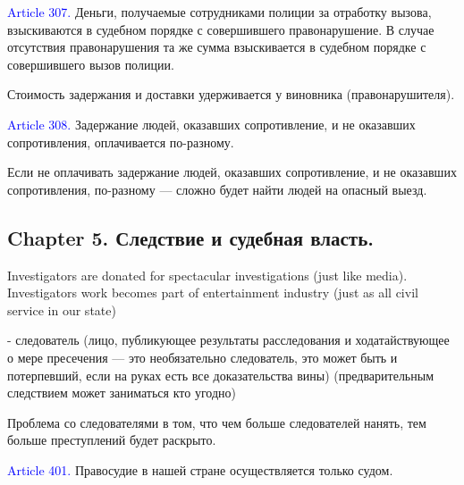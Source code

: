 \documentclass[11pt]{article}
\theoremstyle{remark}
\theoremstyle{definition}
\begin{document}
\color{black}



\textcolor{blue}{Article 307.} Деньги, получаемые сотрудниками полиции за отработку вызова, взыскиваются в судебном порядке с совершившего правонарушение. В случае отсутствия правонарушения та же сумма взыскивается в судебном порядке с совершившего вызов полиции. 

Стоимость задержания и доставки удерживается у виновника (правонарушителя).

\textcolor{blue}{Article 308.} Задержание людей, оказавших сопротивление, и не оказавших сопротивления, оплачивается по-разному.

\color{blue}

Если не оплачивать задержание людей, оказавших сопротивление, и не оказавших сопротивления, по-разному --- сложно будет найти людей на опасный выезд.

\color{black}












\subsection*{Chapter 5. Следствие и судебная власть.} 

Investigators are donated for spectacular investigations (just like media). Investigators work becomes part of entertainment industry (just as all civil service in our state)




- следователь (лицо, публикующее результаты расследования и ходатайствующее о мере пресечения --- это необязательно следователь, это может быть и потерпевший, если на руках есть все доказательства вины) (предварительным следствием может заниматься кто угодно)



Проблема со следователями в том, что чем больше следователей нанять, тем больше преступлений будет раскрыто.



\textcolor{blue}{Article 401.} Правосудие в нашей стране осуществляется только судом. 
\end{document}
